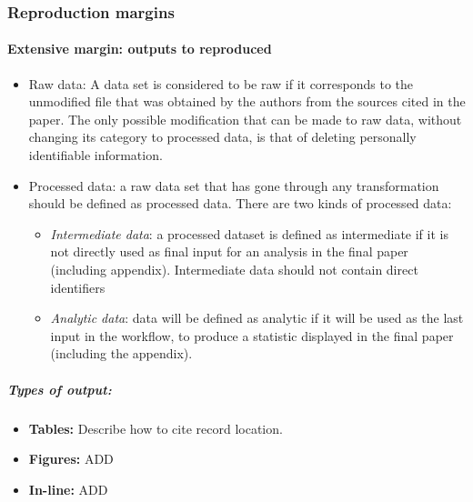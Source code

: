 \documentclass[]{book}
\providecommand{\tightlist}{%
  \setlength{\itemsep}{0pt}\setlength{\parskip}{0pt}}
\let\oldparagraph\paragraph
\renewcommand{\paragraph}[1]{\oldparagraph{#1}\mbox{}}
\let\oldsubparagraph\subparagraph
\renewcommand{\subparagraph}[1]{\oldsubparagraph{#1}\mbox{}}
\begin{document}
\hypertarget{reproduction-margins}{%
\subsubsection{Reproduction margins}\label{reproduction-margins}}

\hypertarget{outputs}{%
\paragraph{Extensive margin: outputs to reproduced}\label{outputs}}

\begin{itemize}
\item
  Raw data: A data set is considered to be raw if it corresponds to the unmodified file that was obtained by the authors from the sources cited in the paper. The only possible modification that can be made to raw data, without changing its category to processed data, is that of deleting personally identifiable information.
\item
  Processed data: a raw data set that has gone through any transformation should be defined as processed data. There are two kinds of processed data:

  \begin{itemize}
  \tightlist
  \item
    \emph{Intermediate data}: a processed dataset is defined as intermediate if it is not directly used as final input for an analysis in the final paper (including appendix). Intermediate data should not contain direct identifiers\\
  \item
    \emph{Analytic data}: data will be defined as analytic if it will be used as the last input in the workflow, to produce a statistic displayed in the final paper (including the appendix).
  \end{itemize}
\end{itemize}

\hypertarget{types-of-output}{%
\subparagraph{Types of output:}\label{types-of-output}}

\begin{itemize}
\tightlist
\item
  \textbf{Tables:} Describe how to cite record location.
\item
  \textbf{Figures:} ADD\\
\item
  \textbf{In-line:} ADD
\end{itemize}
\end{document}
